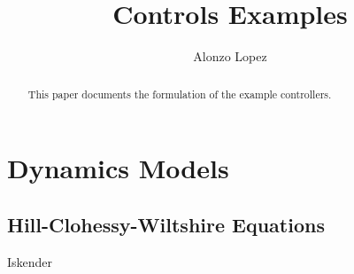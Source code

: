 \documentclass{article}
\title{Controls Examples}
\author{Alonzo Lopez}
\begin{document}
\maketitle

\begin{abstract}
    This paper documents the formulation of the example controllers.
\end{abstract}

\section{Dynamics Models}
\subsection{Hill-Clohessy-Wiltshire Equations}



Iskender \cite{2018_Iskender}
\end{document}
